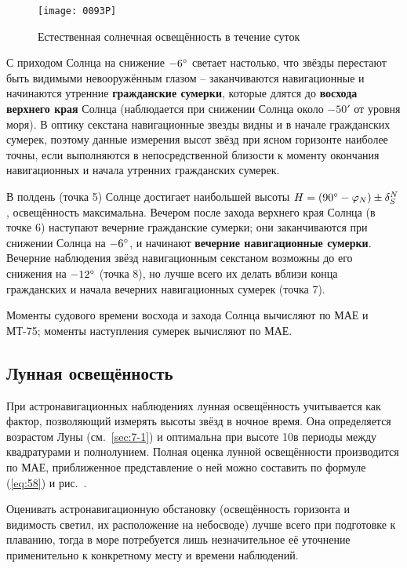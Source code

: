 \begin{figure*}[!htb]
  \centering
  \texttt{[image: 0093P]}
  \caption{Естественная солнечная освещённость в течение суток}
  \label{fig:93}
\end{figure*}

С приходом Солнца на снижение $-6^\circ$ светает настолько, что звёзды
перестают быть видимыми невооружённым глазом \--- заканчиваются
навигационные и начинаются утренние \textbf{гражданские сумерки}, которые
длятся до \textbf{восхода верхнего края} Солнца (наблюдается при снижении
Солнца около $-50'$ от уровня моря). В оптику секстана навигационные
звезды видны и в начале гражданских сумерек, поэтому данные измерения
высот звёзд при ясном горизонте наиболее точны, если выполняются в
непосредственной близости к моменту окончания навигационных и начала
утренних гражданских сумерек.

В полдень (точка 5) Солнце достигает наибольшей высоты
$H = (90^\circ - \varphi_N) \pm \delta^N_S$, освещённость
максимальна. Вечером после захода верхнего края Солнца (в точке 6)
наступают вечерние гражданские сумерки; они заканчиваются при снижении
Солнца на $-6^\circ$, и начинают \textbf{вечерние навигационные сумерки}. Вечерние
наблюдения звёзд навигационным секстаном возможны до его снижения на
$-12^\circ$ (точка 8), но лучше всего их делать вблизи конца гражданских
и начала вечерних навигационных сумерек (точка 7).

Моменты судового времени восхода и захода Солнца вычисляют по МАЕ и
МТ-75; моменты наступления сумерек вычисляют по МАЕ.

\subsection{Лунная освещённость}

При астронавигационных наблюдениях лунная освещённость учитывается как
фактор, позволяющий измерять высоты звёзд в ночное время. Она
определяется возрастом Луны (см.~\ref{sec:7-1}) и оптимальна при
высоте 10\gr в периоды между квадратурами и
полнолунием. Полная оценка лунной освещённости производится по МАЕ,
приближенное представление о ней можно составить по формуле
(\ref{eq:58}) и рис.~.

Оценивать астронавигационную обстановку (освещённость горизонта и
видимость светил, их расположение на небосводе) лучше всего при
подготовке к плаванию, тогда в море потребуется лишь незначительное её
уточнение применительно к конкретному месту и времени наблюдений.

